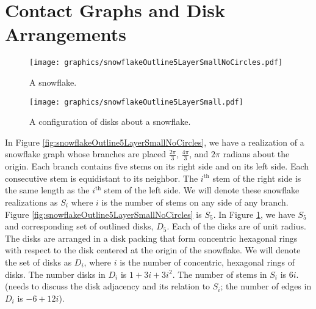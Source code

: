\section{Contact Graphs and Disk Arrangements}

\begin{figure}[!htbp]
\centering
\begin{minipage}{0.45\textwidth}
\centering
\texttt{[image: graphics/snowflakeOutline5LayerSmallNoCircles.pdf]}
\caption{A snowflake.}\label{fig:snowflakeOutline5LayerSmallNoCircles}
\end{minipage}\hfill
\begin{minipage}{0.45\textwidth}
\centering
\texttt{[image: graphics/snowflakeOutline5LayerSmall.pdf]}
\caption{A configuration of disks about a snowflake.}\label{fig:snowflakeOutline5Layer}
\end{minipage}
\end{figure}
In Figure \ref{fig:snowflakeOutline5LayerSmallNoCircles}, we have a realization of a snowflake graph whose branches are placed $\frac{2 \pi}{3}$, $\frac{4 \pi}{3}$, and $2 \pi$ radians about the origin. Each branch contains five stems on its right side and on its left side.  Each consecutive stem is equidistant to its neighbor.  The $i^\text{th}$ stem of the right side is the same length as the $i^\text{th}$ stem of the left side.  We will denote these snowflake realizations as $S_i$ where $i$ is the number of stems on any side of any branch.  Figure \ref{fig:snowflakeOutline5LayerSmallNoCircles} is $S_5$.  In Figure \ref{fig:snowflakeOutline5Layer}, we have $S_5$ and corresponding set of outlined disks, $D_5$.  Each of the disks are of unit radius.  The disks are arranged in a disk packing that form concentric hexagonal rings with respect to the disk centered at the origin of the snowflake.  We will denote the set of disks as $D_i$, where $i$ is the number of concentric, hexagonal rings of disks.  The number disks in $D_i$ is $1+3i+3i^2$.  The number of stems in $S_i$ is $6i$.  (needs to discuss the disk adjacency and its relation to $S_i$; the number of edges in $D_i$ is $-6 +12i$).

